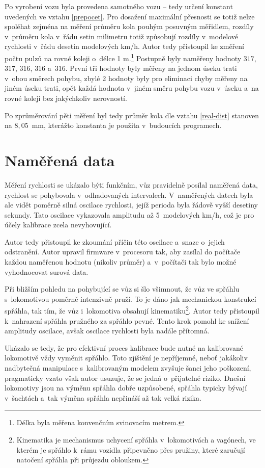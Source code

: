 Po vyrobení vozu byla provedena  samotného vozu -- tedy určení
konstant uvedených ve vztahu \ref{prepocet}. Pro dosažení maximální přesnosti
se totiž nelze spoléhat zejména na měření průměru kola pouhým posuvným
měřidlem, rozdíly v~průměru kola v~řádu setin milimetru totiž způsobují rozdíly
v~modelové rychlosti v~řádu desetin modelových km/h. Autor tedy přistoupil ke
změření počtu pulzů na rovné koleji o~délce 1 m.\footnote{Délka byla měřena
konvenčním svinovacím metrem.} Postupně byly naměřeny hodnoty $317$, $317$,
$316$, $316$ a~$316$. První tři hodnoty byly měřeny na jednom úseku trati
v~obou směrech pohybu, zbylé 2 hodnoty byly pro eliminaci chyby měřeny na
jiném úseku trati, opět každá hodnota v~jiném směru pohybu vozu v~úseku a~na
rovné koleji bez jakýchkoliv nerovností.

Po zprůměrování pěti měření byl tedy průměr kola dle vztahu \ref{real-dist}
stanoven na $8,05$~mm, kterážto konstanta je použita v~budoucích programech.

\section{Naměřená data}
\label{sec:wsm-data}

Měření rychlosti se ukázalo býti funkčním, vůz pravidelně posílal naměřená
data, rychlost se pohybovala v~odhadovaných intervalech. V~naměřených datech
byla ale vidět poměrně silná oscilace rychlosti, jejíž perioda byla řádově
vyšší desetiny sekundy. Tato oscilace vykazovala amplitudu až
5~modelových km/h, což je pro účely kalibrace zcela nevyhovující.

Autor tedy přistoupil ke zkoumání příčin této oscilace a~snaze o~jejich
odstranění. Autor upravil firmware v~procesoru tak, aby zasílal do počítače
každou naměřenou hodnotu (nikoliv průměr) a~v~počítači tak bylo možné
vyhodnocovat surová data.

Při bližším pohledu na pohybující se vůz si šlo všimnout, že vůz ve spřáhlu
s~lokomotivou poměrně intenzivně pruží. To je dáno jak mechanickou konstrukcí
spřáhla, tak tím, že vůz i~lokomotiva obsahují kinematiku\footnote{Kinematika
je mechanismus uchycení spřáhla v~lokomotivách a vagónech, ve kterém je spřáhlo
k~rámu vozidla připevněno přes pružiny, které zaručují natočení spřáhla při
průjezdu obloukem.}.
Autor tedy přistoupil k~nahrazení spřáhla pružného za spřáhlo pevné. Tento krok
pomohl ke snížení amplitudy oscilace, avšak oscilace rychlosti byla nadále
přítomná.

Ukázalo se tedy, že pro efektivní proces kalibrace bude nutné na kalibrované
lokomotivě vždy vyměnit spřáhlo. Toto zjištění je nepříjemné, neboť
jakákoliv nadbytečná manipulace s~kalibrovaným modelem zvyšuje šanci jeho
poškození, pragmaticky vzato však autor usuzuje, že se jedná o~přijatelné
riziko. Dnešní lokomotivy jsou na výměnu spřáhla dobře uzpůsobené, spřáhla
typicky bývají v~šachtách a~tak výměna spřáhla nepřináší až tak velká rizika.

